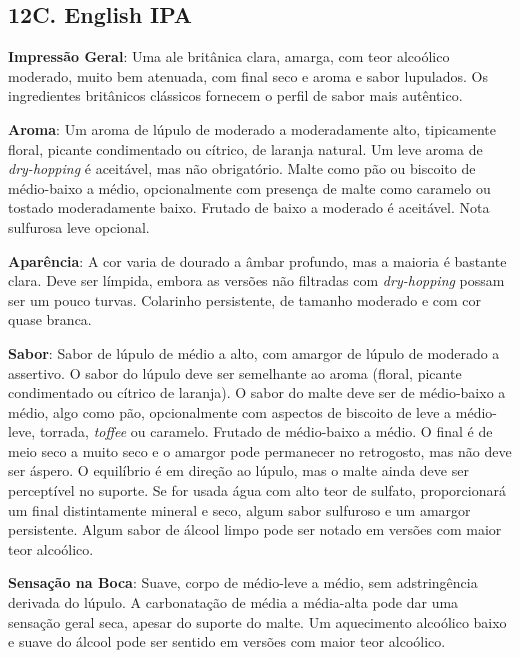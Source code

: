 \subsection*{12C. English IPA}
\textbf{Impressão Geral}: Uma ale britânica clara, amarga, com teor alcoólico moderado, muito bem atenuada, com final seco e aroma e sabor lupulados. Os ingredientes britânicos clássicos fornecem o perfil de sabor mais autêntico.

\textbf{Aroma}: Um aroma de lúpulo de moderado a moderadamente alto, tipicamente floral, picante condimentado ou cítrico, de laranja natural. Um leve aroma de \textit{dry-hopping} é aceitável, mas não obrigatório. Malte como pão ou biscoito de médio-baixo a médio, opcionalmente com presença de malte como caramelo ou tostado moderadamente baixo. Frutado de baixo a moderado é aceitável. Nota sulfurosa leve opcional.

\textbf{Aparência}: A cor varia de dourado a âmbar profundo, mas a maioria é bastante clara. Deve ser límpida, embora as versões não filtradas com \textit{dry-hopping} possam ser um pouco turvas. Colarinho persistente, de tamanho moderado e com cor quase branca.

\textbf{Sabor}: Sabor de lúpulo de médio a alto, com amargor de lúpulo de moderado a assertivo. O sabor do lúpulo deve ser semelhante ao aroma (floral, picante condimentado ou cítrico de laranja). O sabor do malte deve ser de médio-baixo a médio, algo como pão, opcionalmente com aspectos de biscoito de leve a médio-leve, torrada, \textit{toffee} ou caramelo. Frutado de médio-baixo a médio. O final é de meio seco a muito seco e o amargor pode permanecer no retrogosto, mas não deve ser áspero. O equilíbrio é em direção ao lúpulo, mas o malte ainda deve ser perceptível no suporte. Se for usada água com alto teor de sulfato, proporcionará um final distintamente mineral e seco, algum sabor sulfuroso e um amargor persistente. Algum sabor de álcool limpo pode ser notado em versões com maior teor alcoólico.

\textbf{Sensação na Boca}: Suave, corpo de médio-leve a médio, sem adstringência derivada do lúpulo. A carbonatação de média a média-alta pode dar uma sensação geral seca, apesar do suporte do malte. Um aquecimento alcoólico baixo e suave do álcool pode ser sentido em versões com maior teor alcoólico.

